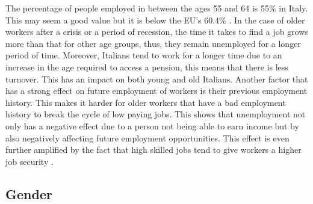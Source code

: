 \documentclass[12pt]{article}
\begin{document}
\begin{spacing}{1.5}
The percentage of people employed in between the ages 55 and 64 is 55\% in Italy. This may seem a good value but it is below the EU's 60.4\% \cite{eurostat2024employment}. In the case of older workers after a crisis or a period of recession, the time it takes to find a job grows more than that for other age groups, thus, they remain unemployed for a longer period of time. Moreover, Italians tend to work for a longer time due to an increase in the age required to access a pension, this means that there is less turnover. This has an impact on both young and old Italians. Another factor that has a strong effect on future employment of workers is their previous employment history. This makes it harder for older workers that have a bad employment history to break the cycle of low paying jobs. This shows that unemployment not only has a negative effect due to a person not being able to earn income but by also negatively affecting future employment opportunities. This effect is even further amplified by the fact that high skilled jobs tend to give workers a higher job security \cite{geroldi2013lavoro}. 

\end{spacing}

\subsection{Gender}
\end{document}
